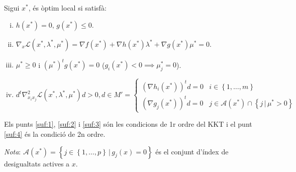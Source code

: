 \begin{prop}
    Sigui $x^*$, \'es \`optim local si satisf\`a:
    \begin{enumerate}[i)]
        \item \label{suf:1} $h\left( x^* \right) = 0,\, g\left( x^* \right) \leq 0$.
        \item \label{suf:2} $\nabla_x \mathcal{L} \left( x^*, \lambda^*, \mu^* \right) = \nabla f\left( x^* \right) + \nabla h\left( x^* \right)\lambda^* + \nabla g\left( x^* \right)\mu^* = 0$.
        \item \label{suf:3} $\mu^* \geq 0$ i $\left( \mu^* \right)^t g\left( x^* \right) = 0$ ($g_i\left( x^* \right) < 0 \implies \mu_j^* = 0$).
        \item \label{suf:4} $d^t \nabla_{x_ix_j}^2 \mathcal{L}\left( x^*, \lambda^*, \mu^* \right) d > 0, d \in M' =
            \begin{cases}
                \left( \nabla h_i\left( x^* \right) \right)^t d = 0 & i \in \left\{1,\dots,m\right\} \\
                \left( \nabla g_j\left( x^* \right) \right)^t d = 0 & j \in \mathcal{A}\left( x^* \right) \cap \left\{ j \,|\, \mu^* > 0 \right\}
            \end{cases}$ \\
    \end{enumerate}
    Els punts \ref{suf:1}, \ref{suf:2} i \ref{suf:3} s\'on les condicions de 1r ordre del KKT i el punt \ref{suf:4} \'es la condici\'o de 2n ordre.
    \begin{adjustwidth}{1cm}{}
    {\it Nota}: $\mathcal{A}\left( x^* \right) = \left\{ j \in \left\{ 1, \dots, p \right\} \, |\, g_j \left( x \right) = 0\right\}$ \'es el conjunt d'\'index de desigualtats actives a $x$.
    \end{adjustwidth}
\end{prop}

